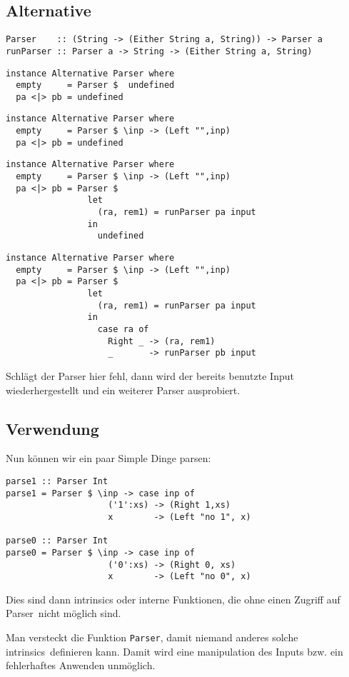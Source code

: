 \documentclass{beamer}
\begin{document}
\subsection{Alternative}
\begin{frame}[fragile]
\begin{verbatim}
Parser    :: (String -> (Either String a, String)) -> Parser a
runParser :: Parser a -> String -> (Either String a, String)
\end{verbatim}
\begin{overprint}
\begin{verbatim}
instance Alternative Parser where
  empty     = Parser $  undefined
  pa <|> pb = undefined
\end{verbatim}
\begin{verbatim}
instance Alternative Parser where
  empty     = Parser $ \inp -> (Left "",inp)
  pa <|> pb = undefined
\end{verbatim}
\begin{verbatim}
instance Alternative Parser where
  empty     = Parser $ \inp -> (Left "",inp)
  pa <|> pb = Parser $  
                let
                  (ra, rem1) = runParser pa input
                in
                  undefined
\end{verbatim}
\begin{verbatim}
instance Alternative Parser where
  empty     = Parser $ \inp -> (Left "",inp)
  pa <|> pb = Parser $  
                let
                  (ra, rem1) = runParser pa input
                in
                  case ra of
                    Right _ -> (ra, rem1)
                    _       -> runParser pb input
\end{verbatim}
Schlägt der Parser hier fehl, dann wird der bereits benutzte Input wiederhergestellt und ein weiterer Parser ausprobiert.
\end{overprint}
\end{frame}

\subsection{Verwendung}

\begin{frame}[fragile]
Nun können wir ein paar Simple Dinge parsen:\bigskip

\begin{verbatim}
parse1 :: Parser Int
parse1 = Parser $ \inp -> case inp of
                    ('1':xs) -> (Right 1,xs)
                    x        -> (Left "no 1", x)

parse0 :: Parser Int
parse0 = Parser $ \inp -> case inp of
                    ('0':xs) -> (Right 0, xs)
                    x        -> (Left "no 0", x)
\end{verbatim}
\pause
Dies sind dann intrinsics oder interne Funktionen, die ohne einen Zugriff auf \glqq Parser\grqq \ nicht möglich sind.\pause

Man versteckt die Funktion \texttt{Parser}, damit niemand anderes solche \glqq intrinsics\grqq \ definieren kann. Damit wird eine manipulation des Inputs bzw. ein fehlerhaftes Anwenden unmöglich.
\end{frame}
\end{document}
